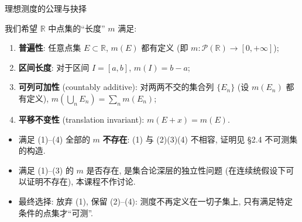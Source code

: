 
\begin{frame}{理想测度的公理与抉择}

我们希望 $\mathbb{R}$ 中点集的``长度'' $m$ 满足:

\begin{enumerate}
\item \textbf{普遍性}: 任意点集 $E \subset \mathbb{R}$, $m(E)$ 都有定义 (即 $m: \mathscr{P}(\mathbb{R}) \to [0, +\infty]$);
\item \textbf{区间长度}: 对于区间 $I = [a,b]$, $m(I) = b - a$;
\item \textbf{可列可加性} (countably additive): 对两两不交的集合列 $\{E_n\}$ (设 $m(E_n)$ 都有定义), $m\left(\bigcup_n E_n\right) = \sum_n m(E_n)$;
\item \textbf{平移不变性} (translation invariant): $m(E + x) = m(E)$.
\end{enumerate}

\pause

\begin{attnblock}
\begin{itemize}[<+->]
\item 满足 (1)--(4) 全部的 $m$ \textbf{不存在}: (1) 与 (2)(3)(4) 不相容, 证明见 \S 2.4 不可测集的构造.
\item 满足 (1)--(3) 的 $m$ 是否存在, 是集合论深层的独立性问题 (在连续统假设下可以证明不存在), 本课程不作讨论.
\item \alert{最终选择: 放弃 (1), 保留 (2)--(4)}: 测度不再定义在一切子集上, 只有满足特定条件的点集才``可测''.
\end{itemize}
\end{attnblock}

\end{frame}


